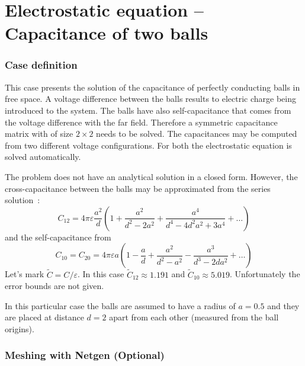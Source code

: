 \chapter{Electrostatic equation -- Capacitance of two balls}




\subsection*{Case definition}

This case presents the solution of the capacitance of perfectly conducting balls in free space. 
A voltage difference between the balls results to electric charge being introduced to the system. The balls have 
also self-capacitance that comes from the voltage difference with the far field. Therefore a symmetric capacitance matrix
with of size $2\times2$ needs to be solved.
The capacitances may be computed from two different voltage configurations.
For both the electrostatic equation is solved automatically. 

The problem does not have an analytical solution in a closed form. 
However, the cross-capacitance between the balls may be approximated from the series solution~\cite[Ch.~A.3]{wasshuber97}:
\begin{equation}
C_{12} = 4 \pi \varepsilon \frac{a^2}{d}\left ( 1 + \frac{a^2}{d^2-2a^2} + \frac{a^4}{d^4-4d^2a^2 + 3a^4}+ \ldots \right )
\end{equation}
and the self-capacitance from 
\begin{equation}
C_{10} = C_{20} = 4 \pi \varepsilon a \left ( 1 - \frac{a}{d} + \frac{a^2}{d^2-a^2} - \frac{a^3}{d^3-2da^2}+ \ldots \right )
\end{equation}
Let's mark $\tilde{C} = C / \varepsilon$. In this case $\tilde{C}_{12} \approx 1.191$ and $\tilde{C}_{10} \approx 5.019$.
Unfortunately the error bounds are not given.

In this particular case 
the balls are assumed to have a radius of $a=0.5$ and they are placed at distance $d=2$ apart from 
each other (measured from the ball origins). 


\subsection*{Meshing with Netgen (Optional)}

